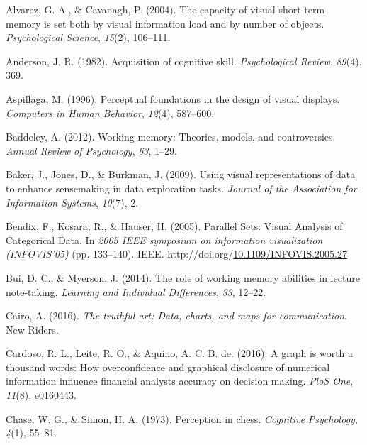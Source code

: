 \documentclass[print]{nuthesis}
\newlength{\cslhangindent}
\newenvironment{CSLReferences}[2]%
{\setlength{\parindent}{0pt}%
\everypar{\setlength{\hangindent}{\cslhangindent}}\ignorespaces}%
{\par}
\begin{document}
\hypertarget{refs}{}
\begin{CSLReferences}{1}{0}
\leavevmode{}%
Alvarez, G. A., \& Cavanagh, P. (2004). The capacity of visual short-term memory is set both by visual information load and by number of objects. \emph{Psychological Science}, \emph{15}(2), 106--111.

\leavevmode{}%
Anderson, J. R. (1982). Acquisition of cognitive skill. \emph{Psychological Review}, \emph{89}(4), 369.

\leavevmode{}%
Aspillaga, M. (1996). Perceptual foundations in the design of visual displays. \emph{Computers in Human Behavior}, \emph{12}(4), 587--600.

\leavevmode{}%
Baddeley, A. (2012). Working memory: Theories, models, and controversies. \emph{Annual Review of Psychology}, \emph{63}, 1--29.

\leavevmode{}%
Baker, J., Jones, D., \& Burkman, J. (2009). Using visual representations of data to enhance sensemaking in data exploration tasks. \emph{Journal of the Association for Information Systems}, \emph{10}(7), 2.

\leavevmode{}%
Bendix, F., Kosara, R., \& Hauser, H. (2005). {Parallel Sets: Visual Analysis of Categorical Data}. In \emph{2005 IEEE symposium on information visualization (INFOVIS'05)} (pp. 133--140). IEEE. http://doi.org/\href{https://doi.org/10.1109/INFOVIS.2005.27}{10.1109/INFOVIS.2005.27}

\leavevmode{}%
Bui, D. C., \& Myerson, J. (2014). The role of working memory abilities in lecture note-taking. \emph{Learning and Individual Differences}, \emph{33}, 12--22.

\leavevmode{}%
Cairo, A. (2016). \emph{The truthful art: Data, charts, and maps for communication}. New Riders.

\leavevmode{}%
Cardoso, R. L., Leite, R. O., \& Aquino, A. C. B. de. (2016). A graph is worth a thousand words: How overconfidence and graphical disclosure of numerical information influence financial analysts accuracy on decision making. \emph{PloS One}, \emph{11}(8), e0160443.

\leavevmode{}%
Chase, W. G., \& Simon, H. A. (1973). Perception in chess. \emph{Cognitive Psychology}, \emph{4}(1), 55--81.


\end{CSLReferences}
\end{document}
